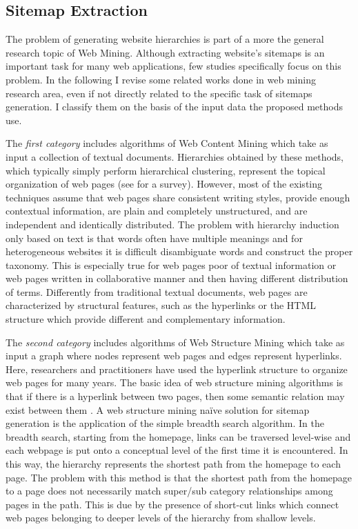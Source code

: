 \subsection{Sitemap Extraction}
The  problem  of  generating  website  hierarchies  is  part  of a more the  general research topic of Web Mining.  Although  extracting website's  sitemaps  is  an  important  task  for  many  web applications,  few  studies specifically focus  on  this  problem.  In the following I revise some related works done in web mining research area, even if not directly related to the specific task of sitemaps generation. I classify them on the basis of the input data the proposed methods use.



The \emph{first category} includes algorithms of Web Content Mining which take as input a collection of textual documents.  Hierarchies  obtained  by  these  methods, which typically simply perform hierarchical clustering,  represent the topical organization of web pages (see \cite{Aggarwal:2012} for a survey). However, most of the existing techniques assume that web pages share  consistent writing  styles, provide  enough  contextual  information,  are plain and completely unstructured, and are independent and identically  distributed. The  problem  with hierarchy  induction only based on text is  that words often have multiple meanings and for heterogeneous websites it is  difficult  disambiguate  words and construct the proper taxonomy. This is especially true for web pages poor of textual information or web pages written in collaborative manner and then having different distribution of terms. Differently from traditional textual documents, web pages are characterized by structural features, such as the hyperlinks or the HTML structure which provide different and complementary information. 


The \emph{second category} includes algorithms of Web Structure Mining which take as input a graph where nodes represent web pages and edges represent hyperlinks. Here, researchers and practitioners have used the hyperlink structure to organize web pages for many years. The basic idea of web structure mining algorithms is that if there is a hyperlink between two pages, then some semantic relation may exist between them \cite{Crescenzi:2005}. %
A web structure mining na\"ive solution for sitemap  generation  is  the application of the simple breadth search algorithm. In the breadth search, starting from the homepage, links can be traversed level-wise and each webpage is  put  onto  a  conceptual  level  of  the first time it is encountered. In this way, the hierarchy represents the shortest path from the homepage to each page. The problem with this method is that the shortest path from  the  homepage  to  a  page  does  not  necessarily  match super/sub category relationships among pages in the path. This is due by the presence of short-cut links which connect web pages belonging to deeper levels of the hierarchy from shallow levels. 



